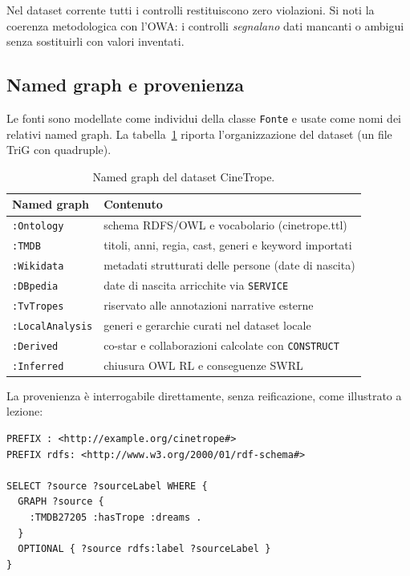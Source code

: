 \documentclass[a4paper,11pt]{article}
\newcommand{\code}[1]{\texttt{#1}}
\begin{document}
Nel dataset corrente tutti i controlli restituiscono zero violazioni. Si
noti la coerenza metodologica con l'OWA: i controlli \emph{segnalano} dati
mancanti o ambigui senza sostituirli con valori inventati.

\subsection{Named graph e provenienza}

Le fonti sono modellate come individui della classe \code{Fonte} e usate
come nomi dei relativi named graph. La tabella~\ref{tab:graphs} riporta
l'organizzazione del dataset (un file TriG con quadruple).

\begin{table}[ht]
\centering
\caption{Named graph del dataset CineTrope.}
\label{tab:graphs}
\small
\begin{tabular}{@{}lp{9.8cm}@{}}
\toprule
\textbf{Named graph} & \textbf{Contenuto} \\
\midrule
\code{:Ontology} & schema RDFS/OWL e vocabolario (cinetrope.ttl) \\
\code{:TMDB} & titoli, anni, regia, cast, generi e keyword importati \\
\code{:Wikidata} & metadati strutturati delle persone (date di nascita) \\
\code{:DBpedia} & date di nascita arricchite via \code{SERVICE} \\
\code{:TvTropes} & riservato alle annotazioni narrative esterne \\
\code{:LocalAnalysis} & generi e gerarchie curati nel dataset locale \\
\code{:Derived} & co-star e collaborazioni calcolate con \code{CONSTRUCT} \\
\code{:Inferred} & chiusura OWL RL e conseguenze SWRL \\
\bottomrule
\end{tabular}
\end{table}

La provenienza \`e interrogabile direttamente, senza reificazione, come
illustrato a lezione:

\begin{lstlisting}[style=sparql, caption={Provenienza di un'asserizione
tramite named graph (\code{05\_provenance\_assertion.rq}).}]
PREFIX : <http://example.org/cinetrope#>
PREFIX rdfs: <http://www.w3.org/2000/01/rdf-schema#>

SELECT ?source ?sourceLabel WHERE {
  GRAPH ?source {
    :TMDB27205 :hasTrope :dreams .
  }
  OPTIONAL { ?source rdfs:label ?sourceLabel }
}
\end{lstlisting}
\end{document}

